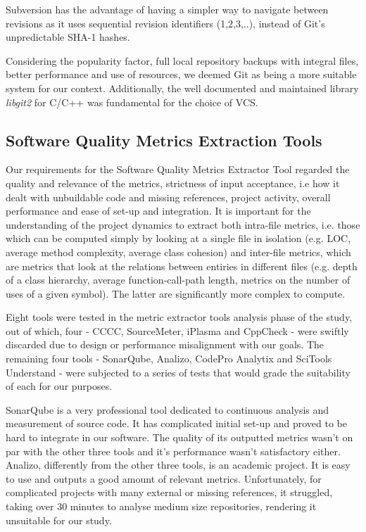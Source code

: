 Subversion has the advantage of having a simpler way to navigate between revisions as it uses sequential revision identifiers (1,2,3,..), instead of Git's unpredictable SHA-1 hashes.

Considering the popularity factor, full local repository backups with integral files, better performance and use of resources, we deemed Git as being a more suitable system for our context. Additionally, the well documented and maintained library \textit{libgit2} for C/C++ was fundamental for the choice of VCS.

\subsection{Software Quality Metrics Extraction Tools} \label{sec:understand}

Our requirements for the Software Quality Metrics Extractor Tool regarded the quality and relevance of the metrics, strictness of input acceptance, i.e how it dealt with unbuildable code and missing references, project activity, overall performance and ease of set-up and integration. It is important for the understanding of the project dynamics to extract both intra-file metrics, i.e. those which can be computed simply by looking at a single file in isolation (e.g. LOC, average method complexity, average class cohesion) and inter-file metrics, which are metrics that look at the relations between entiries in different files (e.g. depth of a class hierarchy, average function-call-path length, metrics on the number of uses of a given symbol). The latter are significantly more complex to compute.

Eight tools were tested in the metric extractor tools analysis phase of the study, out of which, four - CCCC, SourceMeter, iPlasma and CppCheck - were swiftly discarded due to design or performance misalignment with our goals. The remaining four tools - SonarQube, Analizo, CodePro Analytix and SciTools Understand - were subjected to a series of tests that would grade the suitability of each for our purposes.

SonarQube is a very professional tool dedicated to continuous analysis and measurement of source code. It has complicated initial set-up and proved to be hard to integrate in our software. The quality of its outputted metrics wasn't on par with the other three tools and it’s performance wasn’t satisfactory either.
Analizo, differently from the other three tools, is an academic project. It is easy to use and outputs a good amount of relevant metrics. Unfortunately, for complicated projects with many external or missing references, it struggled, taking over 30 minutes to analyse medium size repositories, rendering it unsuitable for our study.

